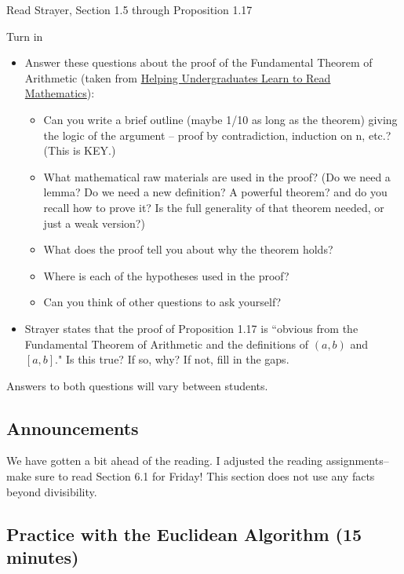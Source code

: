 \documentclass{ximera}
\begin{document}
\begin{pre}
 \item[Read] Strayer, Section 1.5 through Proposition 1.17
 \item[Turn in] 
 \begin{itemize}
	\item Answer these questions about the proof of the Fundamental Theorem of Arithmetic (taken from \href{https://maa.org/node/121566}{Helping Undergraduates Learn to Read Mathematics}):
	
	\begin{itemize}
		\item Can you write a brief outline (maybe 1/10 as long as the theorem) giving the logic of the argument -- proof by contradiction, induction on n, etc.? (This is KEY.)
		\item What mathematical raw materials are used in the proof? (Do we need a lemma? Do we need a new definition? A powerful theorem? and do you recall how to prove it? Is the full generality of that theorem needed, or just a weak version?)
		\item What does the proof tell you about why the theorem holds?
		\item Where is each of the hypotheses used in the proof?
		\item Can you think of other questions to ask yourself?
	\end{itemize}

\item Strayer states that the proof of Proposition 1.17 is ``obvious from the Fundamental Theorem of Arithmetic and the definitions of $(a,b)$ and $[a,b]$." Is this true? If so, why? If not, fill in the gaps.
 \end{itemize}

 
\begin{solution}
Answers to both questions will vary between students.
\end{solution}
\end{pre}

\subsection{Announcements}
We have gotten a bit ahead of the reading. I adjusted the reading assignments--make sure to read Section 6.1 for Friday! This section does not use any facts beyond divisibility.

\subsection{Practice with the Euclidean Algorithm (15 minutes)}
\end{document}
